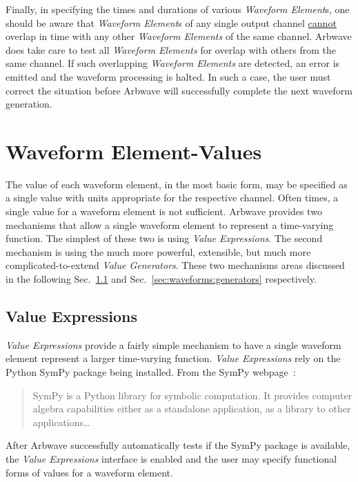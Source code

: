Finally, in specifying the times and durations of various \textit{Waveform
Element}s, one should be aware that \textit{Waveform Element}s of any single
output channel \underline{cannot} overlap in time with any other
\textit{Waveform Elements} of the same channel.  Arbwave does take care to test
all \textit{Waveform Elements} for overlap with others from the same channel.
If such overlapping \textit{Waveform Elements} are detected, an error is emitted
and the waveform processing is halted.  In such a case, the user must correct
the situation before Arbwave will successfully complete the next waveform
generation.



\section{Waveform Element-Values}\label{sec:waveforms:value}

The value of each waveform element, in the most basic form, may be specified as
a single value with units appropriate for the respective channel.
%
Often times, a single value for a waveform element is not sufficient.  Arbwave
provides two mechanisms that allow a single waveform element to represent a
time-varying function.  The simplest of these two is using \textit{Value
Expressions}.  The second mechanism is using the much more powerful, extensible,
but much more complicated-to-extend \textit{Value Generators}.  These two
mechanisms areas discussed in the following Sec.~\ref{sec:waveforms:expr} and
Sec.~\ref{sec:waveforms:generators} respectively.


\subsection{Value Expressions}\label{sec:waveforms:expr}
\textit{Value Expressions} provide a fairly simple mechanism to have a single
waveform element represent a larger time-varying function.  \textit{Value
Expressions} rely on the Python SymPy package being installed.  From the SymPy
webpage~\cite{sympy}:
\begin{quote}
SymPy is a Python library for symbolic computation. It provides computer algebra
capabilities either as a standalone application, as a library to other
applications\ldots
\end{quote}
After Arbwave successfully automatically tests if the SymPy package is
available, the \textit{Value Expressions} interface is enabled and the user may
specify functional forms of values for a waveform element.

